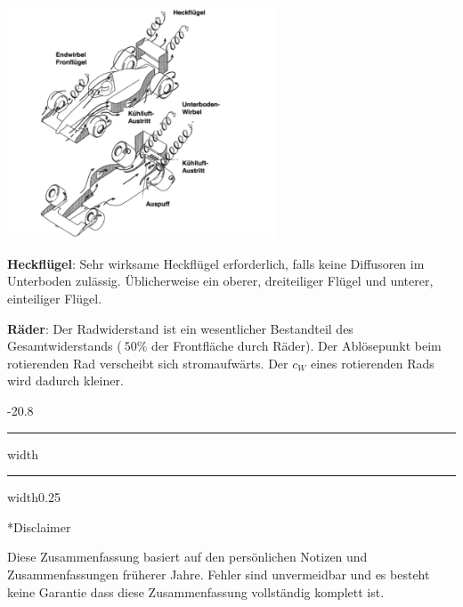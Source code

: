\documentclass[8pt, landscape, fleqn]{scrartcl}
\makeatletter
\renewcommand{\subsection}{\@startsection{subsection}{1}{0mm}%
{-2\baselineskip}{0.8\baselineskip}%
{\hrule depth 0.2pt width\columnwidth\hrule depth0.75pt
width0.25\columnwidth\vspace*{1.2em}\large\bfseries\rmfamily}}
\makeatother
\begin{document}
\begin{multicols*}{3}
\begin{center}
    \includegraphics[width=8cm]{F_1_Wirbel.png}
\end{center}

\textbf{Heckflügel}: Sehr wirksame Heckflügel erforderlich, falls keine Diffusoren im Unterboden zulässig. Üblicherweise ein oberer, dreiteiliger Flügel und unterer, einteiliger Flügel. \newline \newline

\textbf{Räder}: Der Radwiderstand ist ein wesentlicher Bestandteil des Gesamtwiderstands ($~50\%$ der Frontfläche durch Räder). Der Ablösepunkt beim rotierenden Rad verscheibt sich stromaufwärts. Der $c_W$ eines rotierenden Rads wird dadurch kleiner.  

\subsection*{Disclaimer}

Diese Zusammenfassung basiert auf den persönlichen Notizen und Zusammenfassungen früherer Jahre. Fehler sind unvermeidbar und es besteht keine Garantie dass diese Zusammenfassung vollständig komplett ist. 

\end{multicols*}
\end{document}

